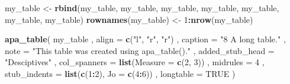 \documentclass[english,man]{apa6}
\newenvironment{Shaded}{\begin{snugshade}}{\end{snugshade}}
\newcommand{\DataTypeTok}[1]{\textcolor[rgb]{0.13,0.29,0.53}{#1}}
\newcommand{\DecValTok}[1]{\textcolor[rgb]{0.00,0.00,0.81}{#1}}
\newcommand{\KeywordTok}[1]{\textcolor[rgb]{0.13,0.29,0.53}{\textbf{#1}}}
\newcommand{\NormalTok}[1]{#1}
\newcommand{\OperatorTok}[1]{\textcolor[rgb]{0.81,0.36,0.00}{\textbf{#1}}}
\newcommand{\OtherTok}[1]{\textcolor[rgb]{0.56,0.35,0.01}{#1}}
\newcommand{\StringTok}[1]{\textcolor[rgb]{0.31,0.60,0.02}{#1}}
\begin{document}
\begin{Shaded}
\begin{Highlighting}[]
\NormalTok{my_table <-}\StringTok{ }\KeywordTok{rbind}\NormalTok{(my_table, my_table, my_table, my_table, my_table, my_table, my_table)}
\KeywordTok{rownames}\NormalTok{(my_table) <-}\StringTok{ }\DecValTok{1}\OperatorTok{:}\KeywordTok{nrow}\NormalTok{(my_table)}

\KeywordTok{apa_table}\NormalTok{(}
\NormalTok{  my_table}
\NormalTok{  , }\DataTypeTok{align =} \KeywordTok{c}\NormalTok{(}\StringTok{"l"}\NormalTok{, }\StringTok{"r"}\NormalTok{, }\StringTok{"r"}\NormalTok{)}
\NormalTok{  , }\DataTypeTok{caption =} \StringTok{"8 A long table."}
\NormalTok{  , }\DataTypeTok{note =} \StringTok{"This table was created using apa_table()."}
\NormalTok{  , }\DataTypeTok{added_stub_head =} \StringTok{"Desciptives"}
\NormalTok{  , }\DataTypeTok{col_spanners =} \KeywordTok{list}\NormalTok{(}\DataTypeTok{Measure =} \KeywordTok{c}\NormalTok{(}\DecValTok{2}\NormalTok{, }\DecValTok{3}\NormalTok{))}
\NormalTok{  , }\DataTypeTok{midrules =} \DecValTok{4}
\NormalTok{  , }\DataTypeTok{stub_indents =} \KeywordTok{list}\NormalTok{(}\KeywordTok{c}\NormalTok{(}\DecValTok{1}\OperatorTok{:}\DecValTok{2}\NormalTok{), }\DataTypeTok{Jo =} \KeywordTok{c}\NormalTok{(}\DecValTok{4}\OperatorTok{:}\DecValTok{6}\NormalTok{))}
\NormalTok{  , }\DataTypeTok{longtable =} \OtherTok{TRUE}
\NormalTok{)}
\end{Highlighting}
\end{Shaded}
\end{document}
